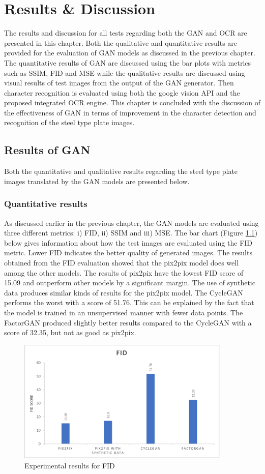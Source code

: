 \chapter{Results \& Discussion}\label{ch:results}
The results and discussion for all tests regarding both the GAN and OCR are presented in this chapter. Both the qualitative and quantitative results are provided for the evaluation of GAN models as discussed in the previous chapter. The quantitative results of GAN are discussed using the bar plots with metrics such as SSIM, FID and MSE while the qualitative results are discussed using visual results of test images from the output of the GAN generator. Then character recognition is evaluated using both the google vision API and the proposed integrated OCR engine. This chapter is concluded with the discussion of the effectiveness of GAN in terms of improvement in the character detection and recognition of the steel type plate images.

\section{Results of GAN}
Both the quantitative and qualitative results regarding the steel type plate images translated by the GAN models are presented below.

\subsection{Quantitative results}
As discussed earlier in the previous chapter, the GAN models are evaluated using three different metrics: i) FID, ii) SSIM and iii) MSE. The bar chart (Figure \ref{fig:fid}) below gives information about how the test images are evaluated using the FID metric. Lower FID indicates the better quality of generated images. The results obtained from the FID evaluation showed that the pix2pix model does well among the other models. The results of pix2pix have the lowest FID score of 15.09  and outperform other models by a significant margin. The use of synthetic data produces similar kinds of results for the pix2pix model. The CycleGAN performs the worst with a score of 51.76. This can be explained by the fact that the model is trained in an unsupervised manner with fewer data points. The FactorGAN produced slightly better results compared to the CycleGAN with a score of 32.35, but not as good as pix2pix.

\begin{figure}[H]
\centering
\includegraphics[width=4in]{images/FID.eps}
\caption{Experimental results for FID}
\label{fig:fid}
\end{figure}


